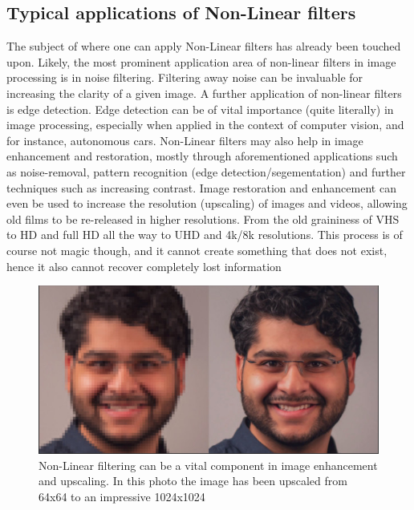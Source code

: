 \documentclass[twoside,a4paper,article]{combine}
\begin{document}
\subsection{Typical applications of Non-Linear filters}
The subject of where one can apply Non-Linear filters has already been touched upon. Likely, the most prominent application area of non-linear filters in image processing is in noise filtering. Filtering away noise can be invaluable for increasing the clarity of a given image. A further application of non-linear filters is edge detection. Edge detection can be of vital importance (quite literally) in image processing, especially when applied in the context of computer vision, and for instance, autonomous cars. Non-Linear filters may also help in image enhancement and restoration, mostly through aforementioned applications such as noise-removal, pattern recognition (edge detection/segementation) and further techniques such as increasing contrast. Image restoration and enhancement can even be used to increase the resolution (upscaling) of images and videos, allowing old films to be re-released in higher resolutions. From the old graininess of VHS to HD and full HD all the way to UHD and 4k/8k resolutions. This process is of course not magic though, and it cannot create something that does not exist, hence it also cannot recover completely lost information\cite{sharmila}\footnotemark{}
\begin{figure}[H]
    \centering
    \includegraphics[width=1\linewidth]{upscaling.PNG}
    \caption{Non-Linear filtering can be a vital component in image enhancement and upscaling. In this photo the image has been upscaled from 64x64 to an impressive 1024x1024}
    \label{fig:enter-label}
\end{figure}
\end{document}

